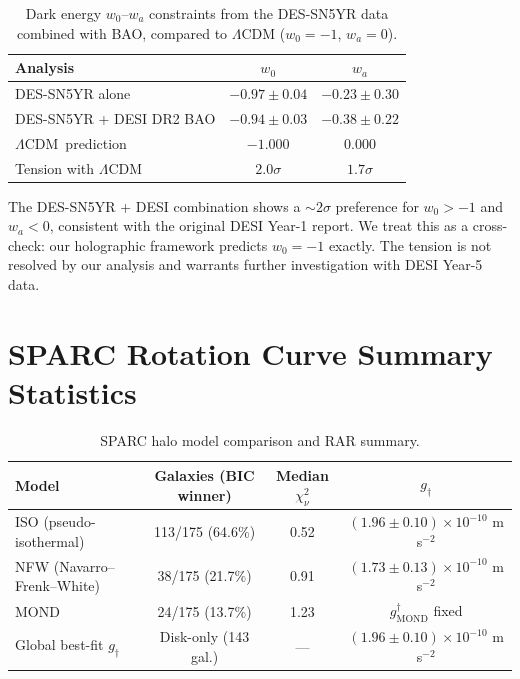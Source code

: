 \documentclass[12pt,a4paper]{article}
\newcommand{\lcdm}{\ensuremath{\Lambda}CDM}
\begin{document}
\begin{table}[h]
\centering
\caption{Dark energy $w_0$--$w_a$ constraints from the DES-SN5YR data
combined with BAO, compared to $\Lambda$CDM ($w_0 = -1$, $w_a = 0$).}
\label{tab:w0wa}
\begin{tabular}{@{}lcc@{}}
\toprule
Analysis & $w_0$ & $w_a$ \\
\midrule
DES-SN5YR alone & $-0.97 \pm 0.04$ & $-0.23 \pm 0.30$ \\
DES-SN5YR + DESI DR2 BAO & $-0.94 \pm 0.03$ & $-0.38 \pm 0.22$ \\
\lcdm\ prediction & $-1.000$ & $0.000$ \\
\midrule
Tension with \lcdm\ & $2.0\sigma$ & $1.7\sigma$ \\
\bottomrule
\end{tabular}
\end{table}

The DES-SN5YR + DESI combination shows a $\sim2\sigma$ preference for
$w_0 > -1$ and $w_a < 0$, consistent with the original DESI Year-1 report.
We treat this as a cross-check: our holographic framework predicts
$w_0 = -1$ exactly.  The tension is not resolved by our analysis
and warrants further investigation with DESI Year-5 data.

\section{SPARC Rotation Curve Summary Statistics}
\label{sec:sparc}

\begin{table}[h]
\centering
\caption{SPARC halo model comparison and RAR summary.}
\label{tab:sparc}
\begin{tabular}{@{}lccc@{}}
\toprule
Model & Galaxies (BIC winner) & Median $\chi^2_\nu$ & $g_\dagger$ \\
\midrule
ISO (pseudo-isothermal) & 113/175 (64.6\%) & 0.52 & $(1.96\pm0.10)\times10^{-10}$ m s$^{-2}$ \\
NFW (Navarro--Frenk--White) & 38/175 (21.7\%) & 0.91 & $(1.73\pm0.13)\times10^{-10}$ m s$^{-2}$ \\
MOND & 24/175 (13.7\%) & 1.23 & $g^\dagger_\mathrm{MOND}$ fixed \\
\midrule
Global best-fit $g_\dagger$ & Disk-only (143 gal.) & --- & $(1.96\pm0.10)\times10^{-10}$ m s$^{-2}$ \\
\bottomrule
\end{tabular}
\end{table}
\end{document}
